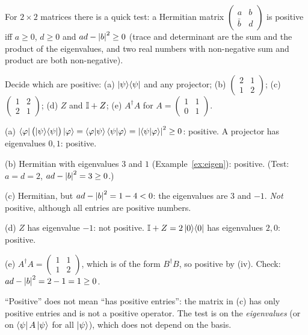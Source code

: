 For $2\times2$ matrices there is a quick test: a Hermitian matrix $\begin{pmatrix}a&b\\\bar b&d\end{pmatrix}$ is positive iff $a\ge0$, $d\ge0$ and $ad-\left|b\right|^2\ge0$ (trace and determinant are the sum and the product of the eigenvalues, and two real numbers with non-negative sum and product are both non-negative).

\begin{example}\label{ex:positive-examples}
  Decide which are positive: (a) $\left|\psi\right\rangle\!\left\langle\psi\right|$ and any projector; (b) $\begin{pmatrix}2&1\\1&2\end{pmatrix}$; (c) $\begin{pmatrix}1&2\\2&1\end{pmatrix}$; (d) $Z$ and $\mathbb{I}+Z$; (e) $A^\dagger A$ for $A=\begin{pmatrix}1&1\\0&1\end{pmatrix}$.
\end{example}
\begin{solution}
  \begin{steps}
    \item (a) $\left\langle\varphi\right|\bigl(\left|\psi\right\rangle\!\left\langle\psi\right|\bigr)\left|\varphi\right\rangle=\left\langle\varphi\middle|\psi\right\rangle\left\langle\psi\middle|\varphi\right\rangle=\left|\left\langle\psi\middle|\varphi\right\rangle\right|^2\ge0$: positive. A projector has eigenvalues $0,1$: positive.
    \item (b) Hermitian with eigenvalues $3$ and $1$ (Example~\ref{ex:eigen}): positive. (Test: $a=d=2$, $ad-\left|b\right|^2=3\ge0$.)
    \item (c) Hermitian, but $ad-\left|b\right|^2=1-4<0$: the eigenvalues are $3$ and $-1$. \emph{Not} positive, although all entries are positive numbers.
    \item (d) $Z$ has eigenvalue $-1$: not positive. $\mathbb{I}+Z=2\left|0\right\rangle\!\left\langle0\right|$ has eigenvalues $2,0$: positive.
    \item (e) $A^\dagger A=\begin{pmatrix}1&1\\1&2\end{pmatrix}$, which is of the form $B^\dagger B$, so positive by (iv). Check: $ad-\left|b\right|^2=2-1=1\ge0$.
  \end{steps}
\end{solution}

\begin{pitfall}
  ``Positive'' does not mean ``has positive entries'': the matrix in (c) has only positive entries and is not a positive operator. The test is on the \emph{eigenvalues} (or on $\left\langle\psi\right| A\left|\psi\right\rangle$ for all $\left|\psi\right\rangle$), which does not depend on the basis.
\end{pitfall}

